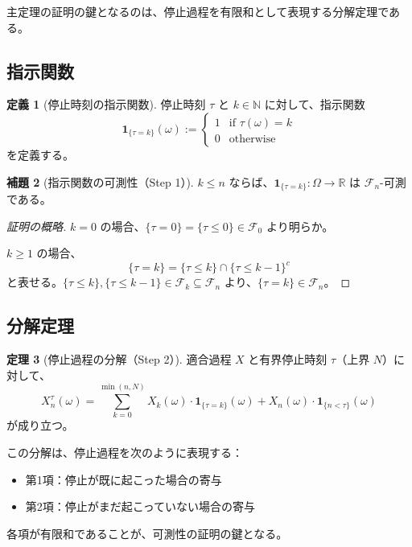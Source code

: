 \documentclass[a4paper,12pt]{ltjsarticle}
\theoremstyle{definition}
\newtheorem{theorem}{定理}[section]
\newtheorem{lemma}[theorem]{補題}
\newtheorem{definition}[theorem]{定義}
\newcommand{\R}{\mathbb{R}}
\newcommand{\N}{\mathbb{N}}
\newcommand{\F}{\mathcal{F}}
\newcommand{\one}{\mathbf{1}}
\begin{document}
主定理の証明の鍵となるのは、停止過程を有限和として表現する分解定理である。

\subsection{指示関数}

\begin{definition}[停止時刻の指示関数]
停止時刻 $\tau$ と $k \in \N$ に対して、指示関数
\[
\one_{\{\tau = k\}}(\omega) :=
\begin{cases}
1 & \text{if } \tau(\omega) = k \\
0 & \text{otherwise}
\end{cases}
\]
を定義する。
\end{definition}

\begin{lemma}[指示関数の可測性（Step 1）]\label{lem:indicator}
$k \leq n$ ならば、$\one_{\{\tau = k\}} : \Omega \to \R$ は $\F_n$-可測である。
\end{lemma}

\begin{proof}[証明の概略]
$k = 0$ の場合、$\{\tau = 0\} = \{\tau \leq 0\} \in \F_0$ より明らか。

$k \geq 1$ の場合、
\[
\{\tau = k\} = \{\tau \leq k\} \cap \{\tau \leq k-1\}^c
\]
と表せる。$\{\tau \leq k\}, \{\tau \leq k-1\} \in \F_k \subseteq \F_n$ より、$\{\tau = k\} \in \F_n$。
\end{proof}

\subsection{分解定理}

\begin{theorem}[停止過程の分解（Step 2）]\label{thm:decomposition}
適合過程 $X$ と有界停止時刻 $\tau$（上界 $N$）に対して、
\[
X^\tau_n(\omega) = \sum_{k=0}^{\min(n,N)} X_k(\omega) \cdot \one_{\{\tau = k\}}(\omega) + X_n(\omega) \cdot \one_{\{n < \tau\}}(\omega)
\]
が成り立つ。
\end{theorem}

\begin{keyidea}[分解の意味]
この分解は、停止過程を次のように表現する：
\begin{itemize}
\item 第1項：停止が既に起こった場合の寄与
\item 第2項：停止がまだ起こっていない場合の寄与
\end{itemize}
各項が有限和であることが、可測性の証明の鍵となる。
\end{keyidea}
\end{document}
